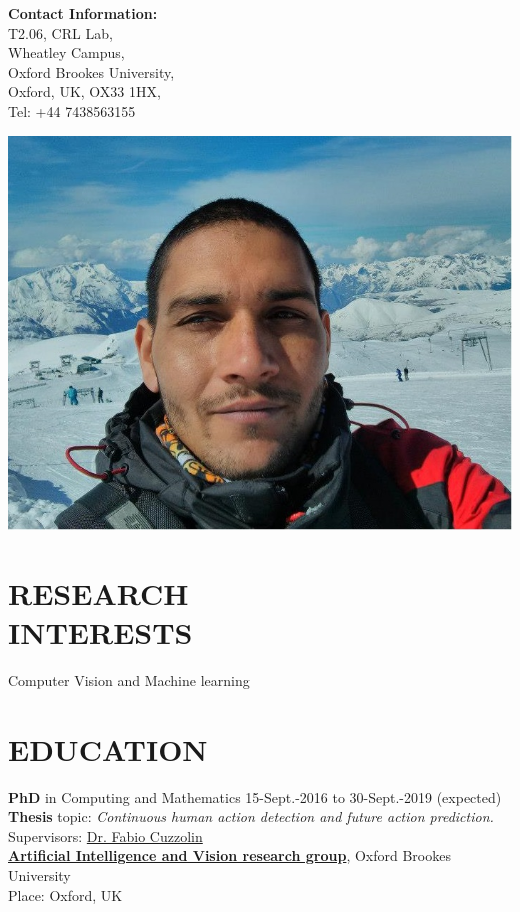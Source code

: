\documentclass[line, margin]{res}
\begin{document}
\address{\textbf{Birth:} Jan'88\\ \textbf{Email:} \href{mailto:15056568@brookes.ac.uk}{\nolinkurl{15056568@brookes.ac.uk}}\\ \textbf{Webpage:} \url{http://gurkirt.github.io/}}

\begin{resume}

\begin{minipage}[c]{0.65\textwidth}
\textbf{Contact Information:}\\
T2.06, CRL Lab,\\
Wheatley Campus,\\
Oxford Brookes University,\\
Oxford, UK, OX33 1HX,\\
Tel: +44 7438563155
\end{minipage}
\begin{minipage}[c]{0.55\textwidth}
\includegraphics[width=.5\linewidth]{me.jpg}
\end{minipage}
\section{RESEARCH\\ INTERESTS}
Computer Vision and Machine learning
\section{EDUCATION} 
\textbf{PhD} in Computing and Mathematics   \hfill 15-Sept.-2016 to 30-Sept.-2019 (expected) \\
\textbf{Thesis} topic: \emph{Continuous human action detection and future action prediction.} \\
Supervisors: \href{http://cms.brookes.ac.uk/staff/FabioCuzzolin/}{Dr. Fabio Cuzzolin}\\
\href{http://cct.brookes.ac.uk/research/isec/artificial-intelligence/index.html}{\textbf{Artificial Intelligence and Vision research group}}, Oxford Brookes University\\
Place: Oxford, UK


\end{resume}
\end{document}
